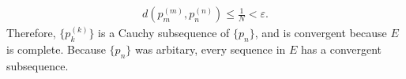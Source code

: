 \documentclass[a4paper,12pt]{article}
\begin{document}
\begin{enumerate}
            \begin{align*}
                d(p_m^{(m)}, p_n^{(n)}) \leq \frac{1}{N} < \varepsilon.
            \end{align*}
            Therefore, $\{ p_k^{(k)} \}$ is a Cauchy subsequence of $\{ p_n \}$, and is convergent because $E$ is complete. Because $\{ p_n \}$ was arbitary, every sequence in $E$ has a convergent subsequence.
            \iffalse
            A closed ball is bounded because it is contained in itself. If $E$ is totally bounded, then for any radius $\varepsilon > 0$, $E$ is the union of a finite number of closed balls of radius $\varepsilon$, which are bounded sets. A union of a finite number of closed subsets is closed, and from (32), a union of a finite number of bounded subsets is bounded. Then $E$ is closed and bounded, and therefore compact.
            \fi
    \end{enumerate}
\end{document}
